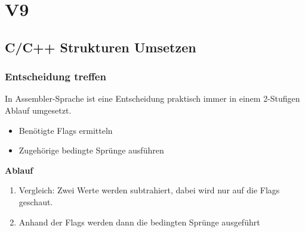 \section{V9}
\subsection{C/C++ Strukturen Umsetzen}
\subsubsection{Entscheidung treffen}
In Assembler-Sprache ist eine Entscheidung praktisch immer in einem 2-Stufigen Ablauf umgesetzt.
\begin{itemize}
    \item Benötigte Flags ermitteln
    \item  Zugehörige bedingte Sprünge ausführen
\end{itemize}

\textbf{Ablauf}\newline
\vspace{-0.5cm}
\begin{enumerate}
    \item Vergleich: Zwei Werte werden subtrahiert, dabei wird nur auf die Flags geschaut.
    \item Anhand der Flags werden dann die bedingten Sprünge ausgeführt
\end{enumerate}















